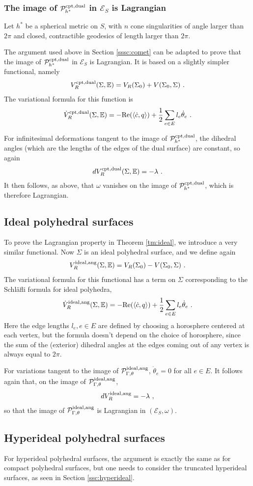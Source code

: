 \documentclass[notitlepage,twoside,a4paper]{amsart}
\newcommand{\Pidang}{\cP^{\rm ideal,ang}_{\Gamma,\theta}}
\newcommand{\Pcodua}{\cP^{\rm cpt,dual}_{h^*}}
\newcommand{\VRcodua}{V_R^{\rm cpt,dual}}
\newcommand{\VRidang}{V_R^{\rm ideal,ang}}
\theoremstyle{named}
\newcommand{\bE}{{\mathbb E}}
\newcommand{\cE}{{\mathcal E}}
\newcommand{\cP}{{\mathcal P}}
\begin{document}
\subsubsection{The image of $\Pcodua$ in $\cE_S$ is Lagrangian}
\label{sssc:codua}

Let $h^*$ be a spherical metric on $S$, with $n$ cone singularities of angle larger than $2\pi$ and closed, contractible geodesics of length larger than $2\pi$. 

The argument used above in Section \ref{sssc:comet} can be adapted to prove that the image of $\Pcodua$ in $\cE_S$ is Lagrangian. It is based on a slightly simpler functional, namely
$$ \VRcodua(\Sigma,\bE) = V_R(\Sigma_0) + V(\Sigma_0,\Sigma)~. $$
The variational formula for this function is
$$ \dot  \VRcodua(\Sigma,\bE) = - \mathrm{Re}(\langle \dot c,q\rangle) + \frac 12\sum_{e\in E} l_e \dot \theta_e~. $$

For infinitesimal deformations tangent to the image of $\Pcodua$, the dihedral angles (which are the lengths of the edges of the dual surface) are constant, so again
$$ d\VRcodua(\Sigma,\bE) = - \lambda~. $$
It then follows, as above, that $\omega$ vanishes on the image of $\Pcodua$, which is therefore Lagrangian.

\subsection{Ideal polyhedral surfaces}

To prove the Lagrangian property in Theorem \ref{tm:ideal}, we introduce a very similar functional. Now $\Sigma$ is an ideal polyhedral surface, and we define again
$$ \VRidang(\Sigma,\bE) = V_R(\Sigma_0) - V(\Sigma_0,\Sigma)~. $$
The variational formula for this functional has a term on $\Sigma$ corresponding to the Schl\"afli formula for ideal polyhedra,
$$ \dot  \VRidang(\Sigma,\bE) = - \mathrm{Re}(\langle \dot c,q\rangle) + \frac 12\sum_{e\in E} l_e \dot \theta_e~. $$
Here the edge lengths $l_e, e\in E$ are defined by choosing a horosphere centered at each vertex, but the formula doesn't depend on the choice of horosphere, since the sum of the (exterior) dihedral angles at the edges coming out of any vertex is always equal to $2\pi$.

For variations tangent to the image of $\Pidang$, $\dot \theta_e=0$ for all $e\in E$. It follows again that, on the image of $\Pidang$,
$$ d\VRidang = -\lambda~, $$
so that the image of $\Pidang$ is Lagrangian in $(\cE_S,\omega)$. 

\subsection{Hyperideal polyhedral surfaces}

For hyperideal polyhedral surfaces, the argument is exactly the same as for compact polyhedral surfaces, but one needs to consider the truncated hyperideal surfaces, as seen in Section \ref{ssc:hyperideal}.




\end{document}
